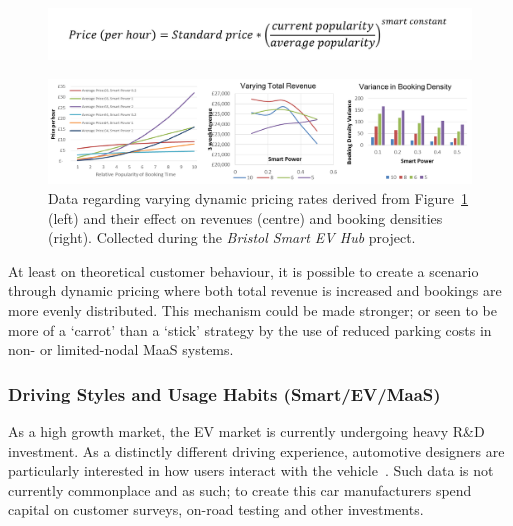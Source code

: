 \documentclass[b5paper,10pt]{article}
\begin{document}
\begin{figure}[htb]
\centering
\includegraphics[width=0.6\columnwidth]{images/smartpricingformula.png}
\label{fig:smartpricingformula}
\end{figure}

\begin{figure}[htb]
\centering
\includegraphics[width=\textwidth]{images/smartpricegraphs.png}
\caption{Data regarding varying dynamic pricing rates derived from Figure~\ref{fig:smartpricingformula} (left) and their effect on revenues (centre) and booking densities (right). Collected during the {\emph{Bristol Smart EV Hub}} project.}
\label{fig:smartpricegraphs}
\end{figure}


At least on theoretical customer behaviour, it is possible to create a
scenario through dynamic pricing where both total revenue is increased
and bookings are more evenly distributed. This mechanism could be made
stronger; or seen to be more of a `carrot' than a `stick' strategy by
the use of reduced parking costs in non- or limited-nodal MaaS
systems.

\subsubsection{Driving Styles and Usage Habits (Smart/EV/MaaS)} 

As a high growth market, the EV market is currently undergoing heavy
R\&D investment. As a distinctly different driving experience,
automotive designers are particularly interested in how users interact
with the vehicle~\cite{ferreira-et-al:2013}. Such data is not
currently commonplace and as such; to create this car manufacturers
spend capital on customer surveys, on-road testing and other
investments.
\end{document}
